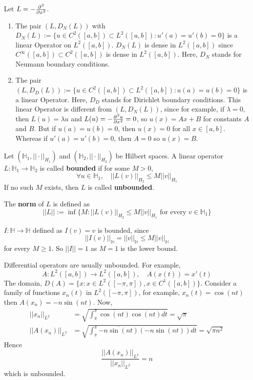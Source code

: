 \begin{example}
	Let $L = -\diffp[2]{}{x}$.
	\begin{enumerate}
		\item The pair $(L, D_N(L))$ with $D_N(L) := \{ u \in C^2([a, b]) \subset L^2 ([a, b]): u'(a) = u'(b) = 0 \}$ is a linear Operator on $L^2 ([a, b])$. $D_N(L)$ is dense in $L^2 ([a, b])$ since $C^{\infty} ([a, b]) \subset C^2 ([a, b])$ is dense in $L^2 ([a, b])$. Here, $D_N$ stands for Neumann boundary conditions.
		\item The pair $(L, D_D (L)) := \{ u \in C^2 ([a, b]) \subset L^2 ([a, b]): u(a) = u(b) = 0 \}$ is a linear Operator. Here, $D_D$ stands for Dirichlet boundary conditions. This linear Operator is different from $(L, D_N(L))$, since for example, if $\lambda = 0$, then $L(u) = \lambda u$ and $L(u) = -\diffp[2]{u}{x} = 0$, so $u(x) = Ax + B$ for constants $A$ and $B$. But if $u(a) = u(b) = 0$, then $u(x) = 0$ for all $x \in [a, b]$. Whereas if $u'(a) = u'(b) = 0$, then $A = 0$ so $u(x) = B$.
	\end{enumerate}
\end{example}

\begin{definition}
	Let $(\mathbb{H}_1, ||\cdot||_{H_1})$ and $(\mathbb{H}_2, ||\cdot||_{H_2})$ be Hilbert spaces. A linear operator $L: \mathbb{H}_1 \rightarrow \mathbb{H}_2$ is called \textbf{bounded} if for some $M > 0$,
	\[
		\forall u \in \mathbb{H}_1, \quad ||L(v)||_{H_2} \le M ||v||_{H_1}
	\]
	If no such $M$ exists, then $L$ is called \textbf{unbounded}.
\end{definition}

\begin{definition}
	The \textbf{norm} of $L$ is defined as
	\[
		||L|| := \inf \{ M: ||L(v)||_{H_2} \le M ||v||_{H_1} \text{ for every } v \in \mathbb{H}_1 \}
	\]
\end{definition}

\begin{example}
	$I: \mathbb{H} \rightarrow \mathbb{H}$ defined as $I(v) = v$ is bounded, since
	\[
		||I(v)||_{\mathbb{H}} = ||v||_{\mathbb{H}} \le M ||v||_{\mathbb{H}}
	\]
	for every $M \ge 1$. So $||I|| = 1$ as $M = 1$ is the lower bound.
\end{example}

\begin{example}
	Differential operators are usually unbounded. For example,
	\[
		A: L^2 ([a, b]) \rightarrow L^2 ([a, b]), \quad A(x(t)) = x'(t)
	\]
	The domain, $D(A) = \{ x: x \in L^2([-\pi, \pi]), x \in C^1 ([a, b]) \}$. Consider a family of functions $x_n(t)$ in $L^2([-\pi, \pi])$, for example, $x_n(t) = \cos(nt)$ then $A(x_n) = -n \sin(nt)$. Now,
	\[
		\begin{aligned}
			||x_n||_{L^2} & = \sqrt{\int_{\pi}^{\pi} \overline{\cos(nt)} \cos(nt) dt} = \sqrt{\pi} \\
			||A(x_n)||_{L^2} & = \sqrt{\int_{\pi}^{\pi} \overline{-n \sin(nt)} (-n \sin(nt)) dt} = \sqrt{\pi n^2}
		\end{aligned}
	\]
	Hence
	\[
		\frac{||A(x_n)||_{L^2}}{||x_n||_{L^2}} = n
	\]
	which is unbounded.
\end{example}

